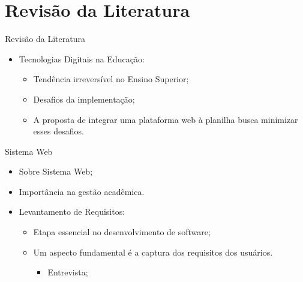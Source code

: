 \section{Revisão da Literatura}

\begin{frame}{Revisão da Literatura}
    \begin{itemize}
        \item Tecnologias Digitais na Educação: \vspace{0.5cm}
              \begin{itemize}
                  \item Tendência irreversível no Ensino Superior; \vspace{0.5cm}
                  \item Desafios da implementação; \vspace{0.5cm}
                  \item A proposta de integrar uma plataforma web à planilha busca minimizar esses desafios. \vspace{0.5cm}
              \end{itemize}
    \end{itemize}
\end{frame}

\begin{frame}{Sistema Web}
    \begin{itemize}
        \item Sobre Sistema Web; \vspace{0.5cm}
        \item Importância na gestão acadêmica. \vspace{0.5cm}
        \item Levantamento de Requisitos: \vspace{0.5cm}
        \begin{itemize}
            \item Etapa essencial no desenvolvimento de software; \vspace{0.5cm}
            \item Um aspecto fundamental é a captura dos requisitos dos usuários. \vspace{0.25cm}
            \begin{itemize}
                \item Entrevista; \vspace{0.25cm} 
            \end{itemize}
        \end{itemize}
    \end{itemize}
\end{frame}

